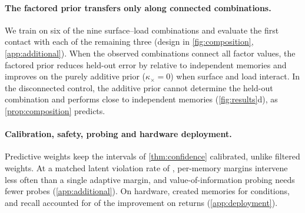 \paragraph{The factored prior transfers only along connected combinations.}
We train on six of the nine surface--load combinations and evaluate the first contact with each of the remaining three (design in \cref{fig:composition}, \cref{app:additional}). When the observed combinations connect all factor values, the factored prior reduces held-out error by  relative to independent memories and improves on the purely additive prior ($\kappa_\times=0$) when surface and load interact. In the disconnected control, the additive prior cannot determine the held-out combination and performs close to independent memories (\cref{fig:results}d), as \cref{prop:composition} predicts.

\paragraph{Calibration, safety, probing and hardware deployment.}
Predictive weights keep the intervals of \cref{thm:confidence} calibrated, unlike filtered weights. At a matched latent violation rate of , per-memory margins intervene  less often than a single adaptive margin, and value-of-information probing needs  fewer probes (\cref{app:additional}). On hardware, \method created  memories for  conditions, and recall accounted for  of the improvement on returns (\cref{app:deployment}).
